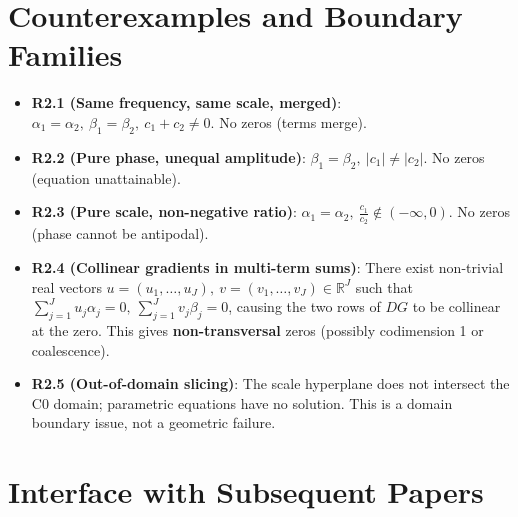 \documentclass[11pt,a4paper]{article}
\theoremstyle{remark}
\begin{document}
\section{Counterexamples and Boundary Families}

\begin{itemize}
\item \textbf{R2.1 (Same frequency, same scale, merged)}: $\alpha_1=\alpha_2,\ \beta_1=\beta_2,\ c_1+c_2\ne0$. No zeros (terms merge).

\item \textbf{R2.2 (Pure phase, unequal amplitude)}: $\beta_1=\beta_2,\ |c_1|\ne|c_2|$. No zeros (equation unattainable).

\item \textbf{R2.3 (Pure scale, non-negative ratio)}: $\alpha_1=\alpha_2,\ \frac{c_1}{c_2}\notin(-\infty,0)$. No zeros (phase cannot be antipodal).

\item \textbf{R2.4 (Collinear gradients in multi-term sums)}: There exist non-trivial real vectors $u=(u_1,\dots,u_J),\ v=(v_1,\dots,v_J)\in\mathbb{R}^J$ such that $\sum_{j=1}^J u_j\alpha_j=0,\ \sum_{j=1}^J v_j\beta_j=0$, causing the two rows of $DG$ to be collinear at the zero. This gives \textbf{non-transversal} zeros (possibly codimension 1 or coalescence).

\item \textbf{R2.5 (Out-of-domain slicing)}: The scale hyperplane does not intersect the C0 domain; parametric equations have no solution. This is a domain boundary issue, not a geometric failure.
\end{itemize}

\section{Interface with Subsequent Papers}
\end{document}
